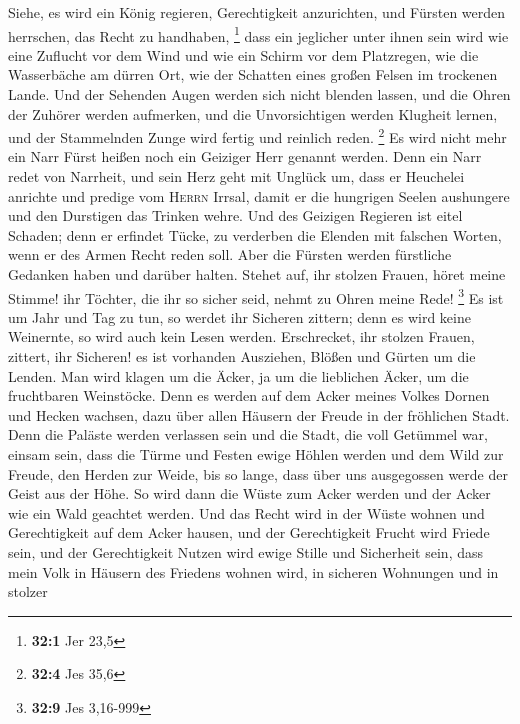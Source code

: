  Siehe, es wird ein König regieren, Gerechtigkeit
anzurichten, und Fürsten werden herrschen, das Recht zu handhaben,
\footnote{\textbf{32:1} Jer 23,5}  dass ein jeglicher
unter ihnen sein wird wie eine Zuflucht vor dem Wind und wie ein Schirm
vor dem Platzregen, wie die Wasserbäche am dürren Ort, wie der Schatten
eines großen Felsen im trockenen Lande.  Und der Sehenden
Augen werden sich nicht blenden lassen, und die Ohren der Zuhörer werden
aufmerken,  und die Unvorsichtigen werden Klugheit lernen,
und der Stammelnden Zunge wird fertig und reinlich reden. \footnote{\textbf{32:4}
  Jes 35,6}  Es wird nicht mehr ein Narr Fürst heißen noch
ein Geiziger Herr genannt werden.  Denn ein Narr redet von
Narrheit, und sein Herz geht mit Unglück um, dass er Heuchelei anrichte
und predige vom \textsc{Herrn} Irrsal, damit er die hungrigen Seelen
aushungere und den Durstigen das Trinken wehre.  Und des
Geizigen Regieren ist eitel Schaden; denn er erfindet Tücke, zu
verderben die Elenden mit falschen Worten, wenn er des Armen Recht reden
soll.  Aber die Fürsten werden fürstliche Gedanken haben
und darüber halten.  Stehet auf, ihr stolzen Frauen, höret
meine Stimme! ihr Töchter, die ihr so sicher seid, nehmt zu Ohren meine
Rede! \footnote{\textbf{32:9} Jes 3,16-999}  Es ist um
Jahr und Tag zu tun, so werdet ihr Sicheren zittern; denn es wird keine
Weinernte, so wird auch kein Lesen werden.  Erschrecket,
ihr stolzen Frauen, zittert, ihr Sicheren! es ist vorhanden Ausziehen,
Blößen und Gürten um die Lenden.  Man wird klagen um die
Äcker, ja um die lieblichen Äcker, um die fruchtbaren Weinstöcke.
 Denn es werden auf dem Acker meines Volkes Dornen und
Hecken wachsen, dazu über allen Häusern der Freude in der fröhlichen
Stadt.  Denn die Paläste werden verlassen sein und die
Stadt, die voll Getümmel war, einsam sein, dass die Türme und Festen
ewige Höhlen werden und dem Wild zur Freude, den Herden zur Weide,
 bis so lange, dass über uns ausgegossen werde der Geist
aus der Höhe. So wird dann die Wüste zum Acker werden und der Acker wie
ein Wald geachtet werden.  Und das Recht wird in der
Wüste wohnen und Gerechtigkeit auf dem Acker hausen,  und
der Gerechtigkeit Frucht wird Friede sein, und der Gerechtigkeit Nutzen
wird ewige Stille und Sicherheit sein,  dass mein Volk in
Häusern des Friedens wohnen wird, in sicheren Wohnungen und in stolzer
